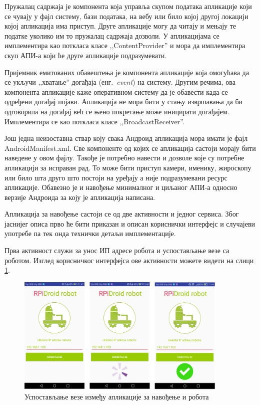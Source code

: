 \documentclass[12pt,oneside]{memoir}
\theoremstyle{remark}
\begin{document}
Пружалац садржаја је компонента која управља скупом података апликације који се чувају у фајл систему, бази података, на вебу или било којој другој локацији којој апликација има приступ. Друге апликације могу да читају и мењају те податке уколико им то пружалац садржаја дозволи. У апликацијама се имплементира као поткласа класе ,,ContentProvider'' и мора да имплементира скуп АПИ-а који ће друге апликације подразумевати.

Пријемник емитованих обавештења је компонента апликације која омогућава да се укључи ,,хватање'' догађаја (енг.~{\em event}) на систему. Другим речима, ова компонента апликације каже оперативном систему да је обавести када се одређени догађај појави. Апликација не мора бити у стању извршавања да би одговорила на догађај већ се њено покретање може иницирати догађајем. Имплементира се као поткласа класе ,,BroadcastReceiver''.

Још једна неизоставна ствар коју свака Андроид апликација мора имати је фајл AndroidManifest.xml. Све компоненте од којих се апликација састоји морају бити наведене у овом фајлу. Такође је потребно навести и дозволе које су потребне апликацији за исправан рад. То може бити приступ камери, именику, жироскопу или било шта друго што постоји на уређају а није подразумевани ресурс апликације. Обавезно је и навођење минималног и циљаног АПИ-а односно верзије Андроида за коју је апликација написана. 

Апликација за навођење састоји се од две активности и једног сервиса. Због јаснијег описа прво ће бити приказан и описан кориснички интерфејс и случајеви употребе па тек онда технички детаљи имплементације. 

Прва активност служи за унос ИП адресе робота и успостављање везе са роботом. Изглед корисничког интерфејса ове активности можете видети на слици \ref{fig:activity1}.

\begin{figure}[!ht]
\centering
\includegraphics[width=0.9\textwidth]{slike/povezivanje.png}
\caption{Успостављање везе између апликације за навођење и робота}
\label{fig:activity1}
\end{figure}
\end{document}
